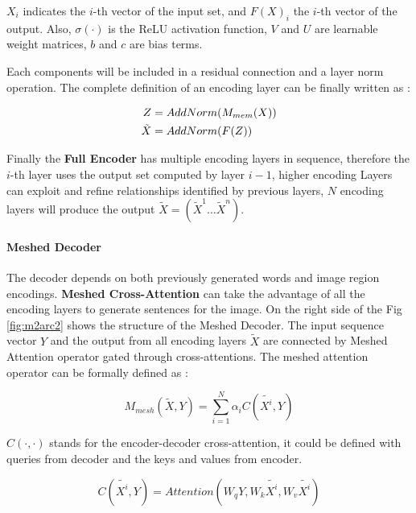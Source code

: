 \documentclass[
]{krantz}
\begin{document}
\(X_i\) indicates the \(i\)-th vector of the input set, and \(F(X)_i\) the \(i\)-th vector of the output. Also, \(\sigma(·)\) is the ReLU activation function, \(V\) and \(U\) are learnable weight matrices, \(b\) and \(c\) are bias terms.\citep{cornia2020m2}

Each components will be included in a residual connection and a layer norm operation. The complete definition of an encoding layer can be finally written as \citep{cornia2020m2}:

\begin{align}
Z &= AddNorm(M_{mem}(X))\notag \\
\tilde{X}&=AddNorm(F(Z))
\end{align}

Finally the \textbf{Full Encoder} has multiple encoding layers in sequence, therefore the \(i\)-th layer uses the output set computed by layer \(i − 1\), higher encoding Layers can exploit and refine relationships identified by previous layers, \(N\) encoding layers will produce the output \(\tilde{X} = (\tilde{X}^1 \dots \tilde{X}^n)\).\citep{cornia2020m2}

\hypertarget{meshed-decoder}{%
\paragraph{Meshed Decoder}\label{meshed-decoder}}

The decoder depends on both previously generated words and image region encodings.
\textbf{Meshed Cross-Attention} can take the advantage of all the encoding layers to generate sentences for the image. On the right side of the Fig \ref{fig:m2arc2} shows the structure of the Meshed Decoder. The input sequence vector \(Y\) and the output from all encoding layers \(\tilde{X}\) are connected by Meshed Attention operator gated through cross-attentions. The meshed attention operator can be formally defined as \citep{cornia2020m2}:

\begin{equation}
M_{mesh}(\tilde{X}, Y) =\sum_{i = 1}^{N}\alpha_i C(\tilde{X^i}, Y)
\end{equation}

\(C(·, ·)\) stands for the encoder-decoder cross-attention, it could be defined with queries from decoder and the keys and values from encoder.\citep{cornia2020m2}

\begin{equation}
C(\tilde{X^i}, Y) = Attention(W_q Y, W_k \tilde{X^i}, W_v \tilde{X^i})
\end{equation}
\end{document}
